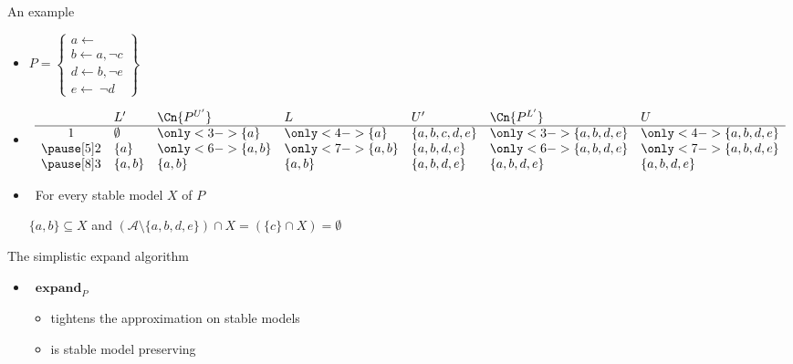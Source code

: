 \begin{frame}{An example}
  \begin{itemize}
  \item<1-> []
    \(
    P
    =
    \left\{
      \begin{array}{l}
        a\leftarrow\\  b\leftarrow a,\neg c\\ d\leftarrow b,\neg e\\ e\leftarrow~\neg d
      \end{array}
    \right\}
    \)
    \smallskip
  \item<2-> []
    \[
      \begin{array}{cllllll}
         & L'                & \Cn{P^{U'}}      & L                & U'                     & \Cn{P^{L'}}          & U                    \\
        \hline
        1&          \emptyset&\only<3->{\{a  \}}&\only<4->{\{a  \}}&          \{a,b,c,d,e\} &\only<3->{\{a,b,d,e\}}&\only<4->{\{a,b,d,e\}}\\\pause[5]
        2&          \{a  \}  &\only<6->{\{a,b\}}&\only<7->{\{a,b\}}&          \{a,b,  d,e\} &\only<6->{\{a,b,d,e\}}&\only<7->{\{a,b,d,e\}}\\\pause[8]
        3&          \{a,b\}  &          \{a,b\} &          \{a,b\} &          \{a,b,  d,e\} &          \{a,b,d,e\} &          \{a,b,d,e\}
      \end{array}
    \]
    \medskip
  \item<9->  \  For every stable model $X$ of $P$
    \par\smallskip
    \quad
    $\{a,b\}\subseteq X$ \quad and \quad
    $(\mathcal{A}\setminus\{a,b,d,e\})\cap X= (\{c\}\cap X)=\emptyset$
  \end{itemize}
\end{frame}
\begin{frame}{The simplistic expand algorithm}
  \bigskip
  \begin{itemize}
  \item {} \ $\mathbf{expand}_{P}$
    \smallskip
    \begin{itemize}\normalsize
  \item tightens the approximation on stable models
    \smallskip
  \item is stable model preserving
  \end{itemize}
\end{itemize}
\end{frame}
